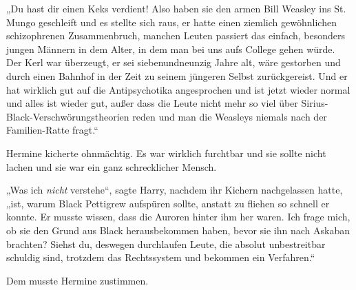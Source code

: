 „Du hast dir einen Keks verdient! Also haben sie den armen Bill Weasley ins St. Mungo geschleift und es stellte sich raus, er hatte einen ziemlich gewöhnlichen schizophrenen Zusammenbruch, manchen Leuten passiert das einfach, besonders jungen Männern in dem Alter, in dem man bei uns aufs College gehen würde. Der Kerl war überzeugt, er sei siebenundneunzig Jahre alt, wäre gestorben und durch einen Bahnhof in der Zeit zu seinem jüngeren Selbst zurückgereist. Und er hat wirklich gut auf die Antipsychotika angesprochen und ist jetzt wieder normal und alles ist wieder gut, außer dass die Leute nicht mehr so viel über Sirius-Black-Verschwörungstheorien reden und man die Weasleys niemals nach der Familien-Ratte fragt.“

Hermine kicherte ohnmächtig. Es war wirklich furchtbar und sie sollte nicht lachen und sie war ein ganz schrecklicher Mensch.

„Was ich \emph{nicht} verstehe“, sagte Harry, nachdem ihr Kichern nachgelassen hatte, „ist, warum Black Pettigrew aufspüren sollte, anstatt zu fliehen so schnell er konnte. Er musste wissen, dass die Auroren hinter ihm her waren. Ich frage mich, ob sie den Grund aus Black herausbekommen haben, bevor sie ihn nach Askaban brachten? Siehst du, deswegen durchlaufen Leute, die absolut unbestreitbar schuldig sind, trotzdem das Rechtssystem und bekommen ein Verfahren.“

Dem musste Hermine zustimmen.

